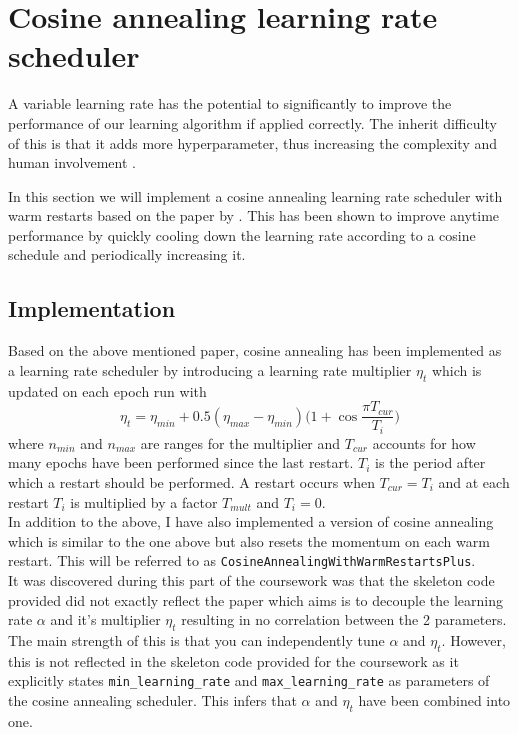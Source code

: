 \documentclass{article}
\begin{document}
\section{Cosine annealing learning rate scheduler}
A variable learning rate has the potential to significantly to improve the performance of our learning algorithm if applied correctly. The inherit difficulty of this is that it adds more hyperparameter, thus increasing the complexity and human involvement \citep{loshchilov2018fixing}.

In this section we will implement a cosine annealing learning rate scheduler with warm restarts based on the paper by \citeauthor{loshchilov2018fixing}. This has been shown to improve anytime performance by quickly cooling down the learning rate according to a cosine schedule and periodically increasing it.

\subsection{Implementation}
Based on the above mentioned paper, cosine annealing has been implemented as a learning rate scheduler by introducing a learning rate multiplier $\eta_t$ which is updated on each epoch run with
$$\eta_t = \eta_{min} + 0.5(\eta_{max} - \eta_{min})(1 + \cos{\dfrac{\pi T_{cur}}{T_i})}$$
where $n_{min}$ and $n_{max}$ are ranges for the multiplier and $T_{cur}$ accounts for how many epochs have been performed since the last restart. $T_i$ is the period after which a restart should be performed. A restart occurs when $T_{cur} = T_i$ and at each restart $T_i$ is multiplied by a factor $T_{mult}$ and $T_i = 0$.
\\
In addition to the above, I have also implemented a version of cosine annealing which is similar to the one above but also resets the momentum on each warm restart. This will be referred to as \texttt{CosineAnnealingWithWarmRestartsPlus}.
\\
It was discovered during this part of the coursework was that the skeleton code provided did not exactly reflect the paper \citep{loshchilov2018fixing} which aims is to decouple the learning rate $\alpha$ and it's multiplier $\eta_t$ resulting in no correlation between the 2 parameters. The main strength of this is that you can independently tune $\alpha$ and $\eta_t$. However, this is not reflected in the skeleton code provided for the coursework as it explicitly states \texttt{min\_learning\_rate} and \texttt{max\_learning\_rate} as parameters of the cosine annealing scheduler. This infers that $\alpha$ and $\eta_t$ have been combined into one.
\end{document}
